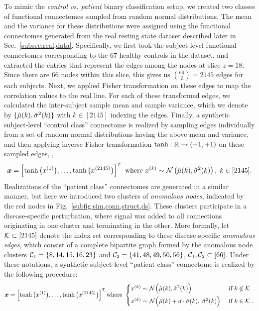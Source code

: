 \newcommand{\muhat}{\xmath{\hat{\mu}}}
\newcommand{\mutil}{\xmath{\widetilde{\mu}}}
\newcommand{\sighat}{\xmath{\hat{\sigma}}}
\newcommand{\arctanh}{\text{arctanh}}
To mimic the \emph{control vs. patient} binary classification setup, we created two classes of functional connectomes sampled from random normal distributions. 
The mean and the variance for these distributions were assigned using the functional connectomes generated from the real resting state dataset described later in Sec.~\ref{subsec:real,data}.
Specifically, we first took the subject-level functional connectomes corresponding to the $67$ healthy controls in the dataset, and extracted the entries that represent the edges among the nodes at slice $z=18$.
Since there are $66$ nodes within this slice, this gives us $\binom{66}{2}=2145$ edges for each subjects.
Next, we applied Fisher transformation on these edges to map the correlation values to the real line.
For each of these transformed edges, we calculated the inter-subject sample mean and sample variance, which we denote by $\{\muhat(k),\sighat^2(k)\}$ with $k\in[2145]$ indexing the edges.
Finally, a synthetic subject-level ``control class'' connectome is realized by sampling edges individually from a set of random normal distributions having the above mean and variance, and then applying inverse Fisher transformation $\tanh:\mathbb{R}\to (-1,+1)$ on these sampled edges, \ie,
\[
	\x=\left[
		\tanh\big(x^{(1)}\big),
		\dots,
		\tanh\big(x^{(2145)}\big)
	\right]^T
	\text{ where } x^{(k)}\sim\calN\left(\muhat(k),\sighat^2(k)\right),\; k\in[2145].
\]
Realizations of the ``patient class'' connectomes are generated in a similar manner, but here we introduced two clusters of \emph{anomalous nodes}, indicated by the red nodes in Fig.~\ref{subfig:sim,conn,struct,ds}.
These clusters participate in a disease-specific perturbation, where signal was added to all connections originating in one cluster and terminating in the other.
More formally, let $\mathcal{K}\subset[2145]$ denote the index set corresponding to these disease-specific \emph{anomalous edges}, which consist of a complete bipartite graph formed by the anomalous node clusters $\mathcal{C}_1=\{8,14,15,16,23\}$ and $\mathcal{C}_2=\{41,48,49,50,56\}$, $\mathcal{C}_1,\mathcal{C}_2\subset[66]$.
Under these notations, a synthetic subject-level ``patient class'' connectome is realized by the following procedure:
\[
	\x=\left[
		\tanh\big(x^{(1)}\big),
		\dots,
		\tanh\big(x^{(2145)}\big)
	\right]^T 
	\text{where } 
	\begin{cases}
		x^{(k)}\sim\calN\Big(\muhat(k),\sighat^2(k)\Big) &\text{ if } k\notin\calK \vspace{3pt}\\
		x^{(k)}\sim\calN\Big(\muhat(k)+d\cdot\sighat(k),\;\sighat^2(k)\Big) &\text{ if } k\in\calK\;.
	\end{cases}
\]
